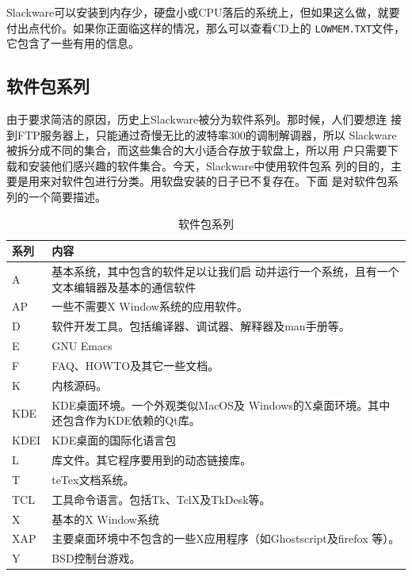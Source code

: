 Slackware可以安装到内存少，硬盘小或CPU落后的系统上，但如果这么做，就要
付出点代价。如果你正面临这样的情况，那么可以查看CD上的
\texttt{LOWMEM.TXT}文件，它包含了一些有用的信息。

\subsection{软件包系列}
\label{sec:installation:systemRequirements:series}

由于要求简洁的原因，历史上Slackware被分为软件系列。那时候，人们要想连
接到FTP服务器上，只能通过奇慢无比的波特率300的调制解调器，所以
Slackware被拆分成不同的集合，而这些集合的大小适合存放于软盘上，所以用
户只需要下载和安装他们感兴趣的软件集合。今天，Slackware中使用软件包系
列的目的，主要是用来对软件包进行分类。用软盘安装的日子已不复存在。下面
是对软件包系列的一个简要描述。

\begin{table}[htpb]
  \centering
  \begin{tabular}{l|l}
    \hline \hline
    系列 & 内容 \\ \hline
    A & \parbox[t]{0.8\textwidth}{基本系统，其中包含的软件足以让我们启
动并运行一个系统，且有一个文本编辑器及基本的通信软件} \\
    AP & 一些不需要X Window系统的应用软件。\\
    D & 软件开发工具。包括编译器、调试器、解释器及man手册等。\\
    E & GNU Emacs\\
    F & FAQ、HOWTO及其它一些文档。\\
    K & 内核源码。\\
    KDE & \parbox[t]{0.8\textwidth}{KDE桌面环境。一个外观类似MacOS及
Windows的X桌面环境。其中还包含作为KDE依赖的Qt库。}\\
    KDEI & KDE桌面的国际化语言包\\
    L & 库文件。其它程序要用到的动态链接库。\\
    T & teTex文档系统。\\
    TCL & 工具命令语言。包括Tk、TclX及TkDesk等。\\
    X & 基本的X Window系统\\
    XAP & 主要桌面环境中不包含的一些X应用程序（如Ghostscript及firefox
    等）。\\
    Y & BSD控制台游戏。\\
    \hline\hline
  \end{tabular}
  \caption{软件包系列}
  \label{tab:softwareSeries}
\end{table}

